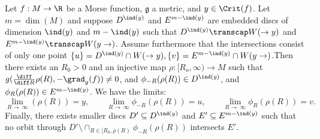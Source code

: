 \begin{lemma} \label{lem: gluing on ends}
	Let $f:M\to \R$ be a Morse function, $\mathfrak{g}$ a metric, and $y \in \Crit(f)$. Let $m=\dim(M)$ and suppose $D^{\ind(y)}$ and $E^{m-\ind(y)}$ are embedded discs of dimension $\ind(y)$ and $m-\ind(y)$ such that $D^{\ind(y)}\transcap W(\to y)$ and $E^{m-\ind(y)} \transcap W(y \to)$. Assume furthermore that the intersections consist of only one point $\{u\}=D^{\ind(y)}\cap W(\to y), \{v\}=E^{m-\ind(y)} \cap W(y \to)$.Then there exists an $R_0>0$ and an injective map $\rho:[R_o,\infty)\to M$ such that $g(\frac{\diff}{\diff R}\rho (R),-\grad_g(f))\neq 0$, and $\phi_{-R}(\rho(R))\in D^{\ind(y)}$, and $\phi_R(\rho(R))\in E^{m-\ind(y)}$. We have the limits:
	\begin{equation*}
		\lim_{R\to\ \infty}(\rho(R))=y, \quad \quad\lim_{R\to\ \infty}\phi_{-R}(\rho(R))=u,\quad \quad \lim_{R\to\ \infty}\phi_{R}(\rho(R))=v. 
	\end{equation*}
	Finally, there exists smaller discs $D'\subseteq D^{\ind(y)}$ and $E'\subseteq E^{m-\ind(y)}$ such that no orbit through $D'\setminus \cap_{R\in[R_0,\rho(R)}\phi_{-R}(\rho(R))$ intersects $E'$.
\end{lemma}
